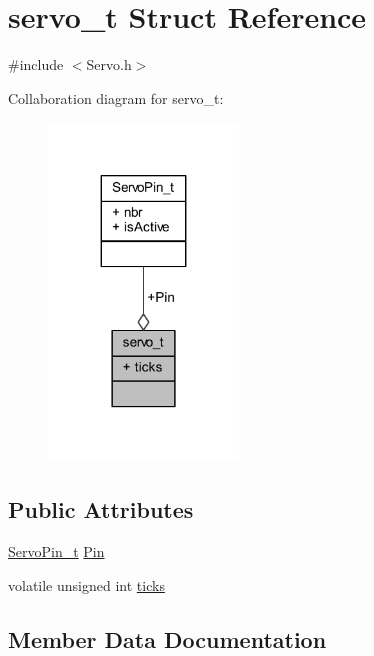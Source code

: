 \hypertarget{structservo__t}{}\section{servo\+\_\+t Struct Reference}
\label{structservo__t}


{\ttfamily \#include $<$Servo.\+h$>$}



Collaboration diagram for servo\+\_\+t\+:
\nopagebreak
\begin{figure}[H]
\begin{center}
\leavevmode
\includegraphics[width=143pt]{d9/dbb/structservo__t__coll__graph}
\end{center}
\end{figure}
\subsection*{Public Attributes}
\begin{DoxyCompactItemize}
\item 
\hyperlink{struct_servo_pin__t}{Servo\+Pin\+\_\+t} \hyperlink{structservo__t_a04bcc6cf13ea5cd2c4dabdc977e054cb}{Pin}
\item 
volatile unsigned int \hyperlink{structservo__t_a9405b5e5266318f889ef6ff95a97943b}{ticks}
\end{DoxyCompactItemize}


\subsection{Member Data Documentation}
\mbox{\label{structservo__t_a04bcc6cf13ea5cd2c4dabdc977e054cb}} 
